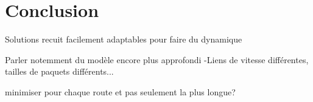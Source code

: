 
\chapter*{Conclusion}
\label{chap:concl}


Solutions recuit facilement adaptables pour faire du dynamique 

Parler notemment du modèle encore plus approfondi -Liens de vitesse différentes, tailles de paquets différents...

minimiser pour chaque route et pas seulement la plus longue?

